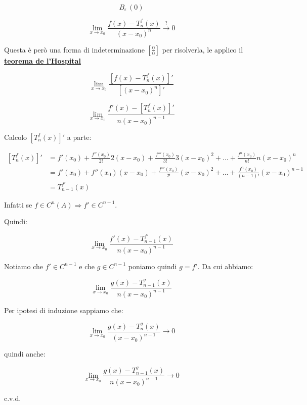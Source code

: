 \documentclass[../dimostrazioni]{subfiles}
\begin{document}
        \[ B_\epsilon \, (0)\]

        \[  \lim_{x \to x_0} \frac{f(x)-T _n ^ f (x)}{(x-x_0)^n} \stackrel{?}{\rightarrow} 0\]

        Questa è però una forma di indeterminazione \(\left[\frac{0}{0}\right]\) per risolverla, le applico il \textbf{\hyperref[teoHopital]{teorema de l'Hospital}}
        
        \[  \lim_{x \to x_0} \frac{\left[f(x)-T _n ^ f (x)\right]'}{\left[(x-x_0)^n\right]'}    \]

        \[  \lim_{x \to x_0} \frac{f'(x)-\left[T _n ^ f (x)\right]'}{n(x-x_0)^{n-1}}    \]

        Calcolo \(\left[T _n ^ f (x)\right]'\) a parte:

        \begin{align*}
            \left[T _n ^ f (x)\right]' &= f'(x_0) + \frac{f''(x_0)}{2!}2(x-x_0) + \frac{f'''(x_0)}{3!}3(x-x_0)^2 + \dots + \frac{f^n(x_0)}{n!}n(x-x_0)^n \\
                                    &= f'(x_0) + f''(x_0)(x-x_0) + \frac{f'''(x_0)}{2!}(x-x_0)^2 + \dots + \frac{f^n(x_0)}{(n-1)!}(x-x_0)^{n-1} \\
                                    &= T_{n-1} ^{f'} (x)
        \end{align*}

        Infatti se \(f \in C^n (A) \Rightarrow f' \in C^{n-1} \).

        Quindi:

        \[  \lim_{x \to x_0} \frac{f'(x)-T_{n-1} ^{f'} (x)}{n(x-x_0)^{n-1}}    \]

        Notiamo che \(f' \in C^{n-1}\) e che \(g \in C^{n-1}\) poniamo quindi \(g = f'\). Da cui abbiamo:

        \[  \lim_{x \to x_0} \frac{g(x)-T_{n-1} ^{g} (x)}{n(x-x_0)^{n-1}}    \]

        Per ipotesi di induzione sappiamo che:

        \[  \lim_{x \to x_0} \frac{g(x) - T _n ^ g (x)}{(x-x_0)^{n-1}} \rightarrow 0 \]

        quindi anche:

        \[  \lim_{x \to x_0} \frac{g(x)-T_{n-1} ^{g} (x)}{n(x-x_0)^{n-1}}  \rightarrow 0  \]

        c.v.d.

        
\end{document}
